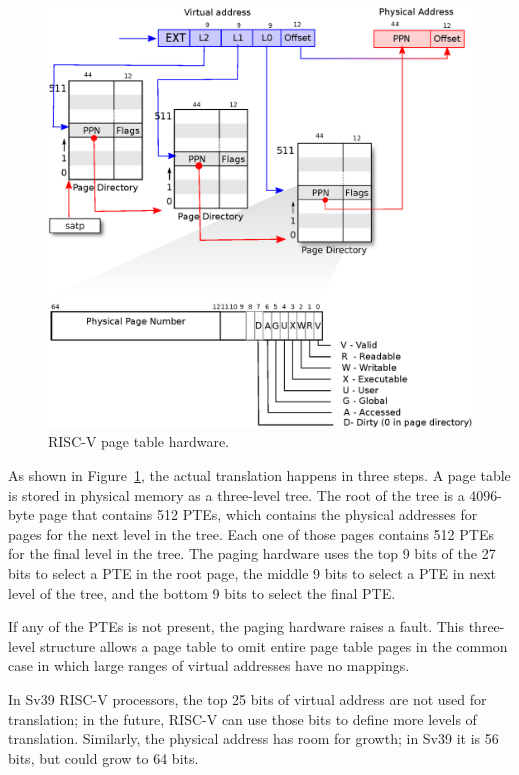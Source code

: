 \begin{figure}[t]
\center
\includegraphics[scale=0.5]{fig/riscv_pagetable.eps}
\caption{RISC-V page table hardware.}
\label{fig:riscv_pagetable}
\end{figure}

As shown in
Figure~\ref{fig:riscv_pagetable},
the actual translation happens in three steps.  A page table is stored
in physical memory as a three-level tree.
The root of the tree is a
4096-byte page that contains 512 PTEs, which contains the physical
addresses for pages for the next level in the tree.  Each one of those
pages contains 512 PTEs for the final level in the tree.  The paging
hardware uses the top 9 bits of the 27 bits to select a PTE in the
root page, the middle 9 bits to select a PTE in next level of the
tree, and the bottom 9 bits to select the final PTE.

If any of the PTEs is not present, the paging hardware raises a fault.
This three-level structure allows a page table to omit entire page
table pages in the common case in which large ranges of virtual
addresses have no mappings.

In Sv39 RISC-V processors, the top 25 bits of virtual address are not
used for translation; in the future, RISC-V can use those bits to
define more levels of translation.  Similarly, the physical address
has room for growth; in Sv39 it is 56 bits, but could grow to 64 bits.


